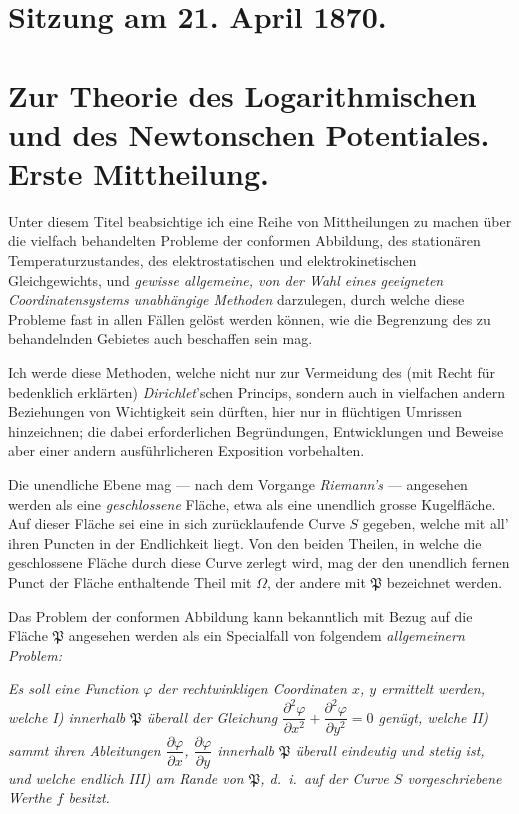 \documentclass{article}
\begin{document}

\section*{Sitzung am 21. April 1870.}

\section*{Zur Theorie des Logarithmischen und des Newtonschen Potentiales. Erste Mittheilung.}

Unter diesem Titel beabsichtige ich eine Reihe von Mittheilungen zu machen über die vielfach behandelten Probleme der conformen Abbildung, des stationären Temperaturzustandes, des elektrostatischen und elektrokinetischen Gleichgewichts, und \emph{gewisse allgemeine, von der Wahl eines geeigneten Coordinatensystems unabhängige Methoden} darzulegen, durch welche diese Probleme fast in allen Fällen gelöst werden können, wie die Begrenzung des zu behandelnden Gebietes auch beschaffen sein mag.

Ich werde diese Methoden, welche nicht nur zur Vermeidung des (mit Recht für bedenklich erklärten) \emph{Dirichlet}'schen Princips, sondern auch in vielfachen andern Beziehungen von Wichtigkeit sein dürften, hier nur in flüchtigen Umrissen hinzeichnen; die dabei erforderlichen Begründungen, Entwicklungen und Beweise aber einer andern ausführlicheren Exposition vorbehalten.

Die unendliche Ebene mag --- nach dem Vorgange \emph{Riemann's} --- angesehen werden als eine \emph{geschlossene} Fläche, etwa als eine unendlich grosse Kugelfläche. Auf dieser Fläche sei eine in sich zurücklaufende Curve $S$ gegeben, welche mit all' ihren Puncten in der Endlichkeit liegt. Von den beiden Theilen, in welche die geschlossene Fläche durch diese Curve zerlegt wird, mag der den unendlich fernen Punct der Fläche enthaltende Theil mit $\Omega$, der andere mit $\mathfrak{P}$ bezeichnet werden.

Das Problem der conformen Abbildung kann bekanntlich
mit Bezug auf die Fläche $\mathfrak{P}$ angesehen werden als ein Specialfall von folgendem \emph{allgemeinern Problem:}

\emph{Es soll eine Function $\varphi$ der rechtwinkligen Coordinaten $x$, $y$ ermittelt werden, welche I) innerhalb $\mathfrak{P}$ überall der Gleichung $\dfrac{\partial^{2}\varphi}{\partial x^{2}}+\dfrac{\partial^{2}\varphi}{\partial y^{2}}=0$ genügt, welche II) sammt ihren Ableitungen $\dfrac{\partial\varphi}{\partial x}$, $\dfrac{\partial\varphi}{\partial y}$ innerhalb $\mathfrak{P}$ überall eindeutig und stetig ist, und welche endlich III) am Rande von $\mathfrak{P}$, d.\ i.\ auf der Curve $S$ vorgeschriebene Werthe $f$ besitzt.}
\end{document}
